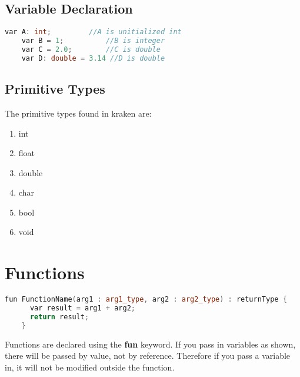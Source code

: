 \documentclass{article}
\begin{document}
\subsection{Variable Declaration}
  \begin{lstlisting}[language=C++]
    var A: int;         //A is unitialized int
    var B = 1;          //B is integer
    var C = 2.0;        //C is double
    var D: double = 3.14 //D is double

  \end{lstlisting}
\subsection{Primitive Types}
  The primitive types found in kraken are:
    \begin{enumerate}
      \item int
      \item float
      \item double
      \item char
      \item bool
      \item void
    \end{enumerate}

\section{Functions}
   \begin{lstlisting}[language=C++]
    fun FunctionName(arg1 : arg1_type, arg2 : arg2_type) : returnType {
      var result = arg1 + arg2;
      return result;
    }
  \end{lstlisting}

    Functions are declared using the {\bf{fun}} keyword.  If you pass in 
  variables as shown, there will be passed by value, not by reference.  
  Therefore if you pass a variable in, it will not be modified outside the
  function.
\end{document}
